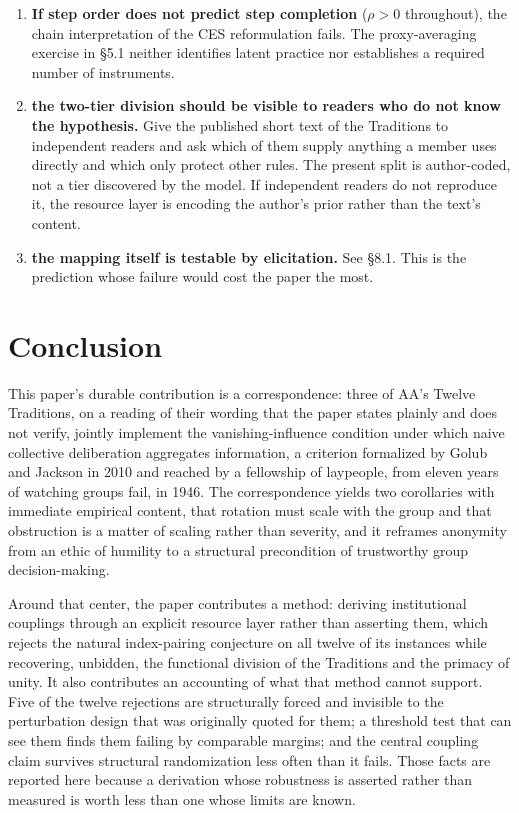 \documentclass[11pt,a4paper]{article}
\begin{document}
\begin{enumerate}
\item \textbf{If step order does not predict step completion} ($\rho > 0$
throughout), the chain interpretation of the CES reformulation fails. The
proxy-averaging exercise in \S5.1 neither identifies latent practice nor establishes
a required number of instruments.

\item \textbf{the two-tier division should be visible to readers who do not
know the hypothesis.} Give the published short text of the Traditions to
independent readers and ask which of them supply anything a member uses directly
and which only protect other rules. The present split is author-coded, not a tier
discovered by the model. If independent readers do not reproduce it, the resource
layer is encoding the author's prior rather than the text's content.

\item \textbf{the mapping itself is testable by elicitation.} See \S8.1. This
is the prediction whose failure would cost the paper the most.
\end{enumerate}

\section{Conclusion}

This paper's durable contribution is a correspondence: three of AA's Twelve
Traditions, on a reading of their wording that the paper states plainly and does
not verify, jointly implement the vanishing-influence condition under which naive
collective deliberation aggregates information, a criterion formalized by Golub
and Jackson in 2010 and reached by a fellowship of laypeople, from eleven years of
watching groups fail, in 1946. The correspondence yields two corollaries with
immediate empirical content, that rotation must scale with the group and that
obstruction is a matter of scaling rather than severity, and it reframes anonymity
from an ethic of humility to a structural precondition of trustworthy group
decision-making.

Around that center, the paper contributes a method: deriving institutional
couplings through an explicit resource layer rather than asserting them, which
rejects the natural index-pairing conjecture on all twelve of its instances while
recovering, unbidden, the functional division of the Traditions and the primacy of
unity. It also contributes an accounting of what that method cannot support. Five
of the twelve rejections are structurally forced and invisible to the perturbation
design that was originally quoted for them; a threshold test that can see them
finds them failing by comparable margins; and the central coupling claim survives
structural randomization less often than it fails. Those facts are reported here
because a derivation whose robustness is asserted rather than measured is worth
less than one whose limits are known.
\end{document}

